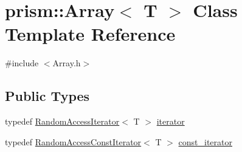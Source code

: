 \hypertarget{classprism_1_1_array}{}\section{prism\+:\+:Array$<$ T $>$ Class Template Reference}
\label{classprism_1_1_array}


{\ttfamily \#include $<$Array.\+h$>$}

\subsection*{Public Types}
\begin{DoxyCompactItemize}
\item 
typedef \hyperlink{classprism_1_1_random_access_iterator}{Random\+Access\+Iterator}$<$ T $>$ \hyperlink{classprism_1_1_array_a6814c2af67e8b3fc48b02319f5e63d50}{iterator}
\item 
typedef \hyperlink{classprism_1_1_random_access_const_iterator}{Random\+Access\+Const\+Iterator}$<$ T $>$ \hyperlink{classprism_1_1_array_ab78c83a88959a72d59e5f930540be94a}{const\+\_\+iterator}
\end{DoxyCompactItemize}
